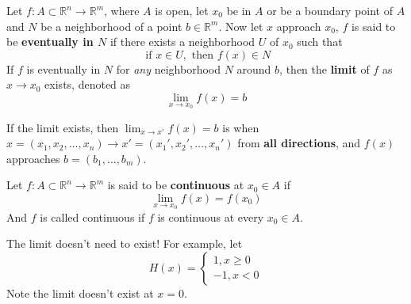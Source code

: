 \documentclass[openany]{book}
\newcommand{\R}{\mathbb{R}}
\begin{document}
\begin{defn}[limit]
    Let $f: A\subset\R^n\to\R^m$, where $A$ is open, let $x_0$ be in $A$ or be a boundary point of $A$ and $N$ be a neighborhood of a point $b\in\R^m$. Now let $x$ approach $x_0$, $f$ is said to be \textbf{eventually in $N$} if there exists a neighborhood $U$ of $x_0$ such that 
    \begin{equation*}
        \text{ if } x\in U, \text{ then } f(x)\in N
    \end{equation*}
    If $f$ is eventually in $N$ for \textit{any} neighborhood $N$ around $b$, then the \textbf{limit} of $f$ as $x\to x_0$ exists, denoted as 
    \begin{equation*}
        \lim_{x\to x_0}f(x)=b
    \end{equation*}
\end{defn}

\begin{defn}[limit']
    If the limit exists, then $\lim_{x\to x'}f(x)=b$ is when $x=(x_1, x_2, \dots, x_n)\to x'=(x_1',x_2',\dots, x_n')$ from \textbf{all directions}, and $f(x)$ approaches $b=(b_1,\dots, b_m)$.
\end{defn}



\begin{defn}[continuity]
    Let $f:A\subset\R^n\to\R^m$ is said to be \textbf{continuous} at $x_0\in A$ if 
    \begin{equation*}
        \lim_{x\to x_0}f(x)=f(x_0)
    \end{equation*}
    And $f$ is called continuous if $f$ is continuous at every $x_0\in A$.
\end{defn}

\begin{example}
    The limit doesn't need to exist! For example, let 
    \begin{equation*}
        H(x)=\begin{cases}
            1, x\geq 0\\
            -1, x<0
        \end{cases}
    \end{equation*}
    Note the limit doesn't exist at $x=0$.
\end{example}
\end{document}
